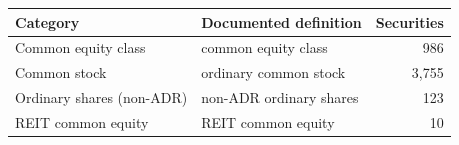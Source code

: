 \begin{tabular}{@{}llr@{}}
\toprule
Category & Documented definition & Securities \\
\midrule
Common equity class & common equity class & 986 \\
Common stock & ordinary common stock & 3,755 \\
Ordinary shares (non-ADR) & non-ADR ordinary shares & 123 \\
REIT common equity & REIT common equity & 10 \\
\bottomrule
\end{tabular}
